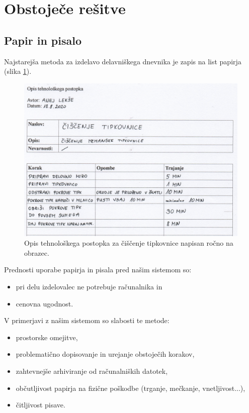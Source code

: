\documentclass[a4paper, 12pt]{book}
\begin{document}
\section{Obstoječe rešitve}



\subsection{Papir in pisalo}

Najstarejša metoda za izdelavo delavniškega dnevnika je zapis na list papirja (slika \ref{paper}).

\begin{figure}[H]
\begin{center}
\includegraphics[width=13.5cm]{report_paper_small}
\end{center}
\caption{Opis tehnološkega postopka za čiščenje tipkovnice napisan ročno na obrazec.}
\label{paper}
\end{figure}


\noindent Prednosti uporabe papirja in pisala pred našim sistemom so:
\begin{itemize}
	\item pri delu izdelovalec ne potrebuje računalnika in
	\item cenovna ugodnost.
\end{itemize}
V primerjavi z našim sistemom so slabosti te metode:
\begin{itemize}
	\item prostorske omejitve,
	\item problematično dopisovanje in urejanje obstoječih korakov,
	\item zahtevnejše arhiviranje od računalniških datotek,
	\item občutljivost papirja na fizične poškodbe (trganje, mečkanje, vnetljivost...),
	\item čitljivost pisave.
\end{itemize}
\end{document}
